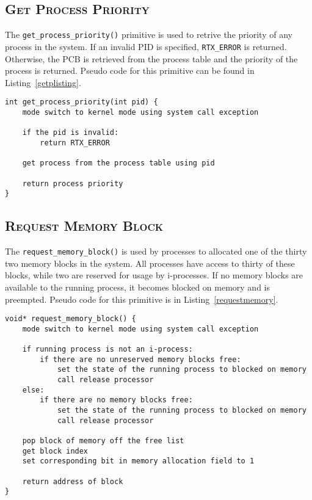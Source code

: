 \documentclass[oneside]{report}
\begin{document}
\subsection{\textsc{Get Process Priority}}
The \texttt{get\_process\_priority()} primitive is used to retrive the
priority of any process in the system. If an invalid PID is specified,
\texttt{RTX\_ERROR} is returned. Otherwise, the PCB is retrieved from
the process table and the priority of the process is returned. Pseudo
code for this primitive can be found in Listing~\ref{getplisting}.

\begin{lstlisting}
int get_process_priority(int pid) {
    mode switch to kernel mode using system call exception
    
    if the pid is invalid:
        return RTX_ERROR

    get process from the process table using pid
    
    return process priority
}
\end{lstlisting}

\subsection{\textsc{Request Memory Block}}

The \texttt{request\_memory\_block()} is used by processes to
allocated one of the thirty two memory blocks in the system. All
processes have access to thirty of these blocks, while two are
reserved for usage by i-processes. If no memory blocks are available
to the running process, it becomes blocked on memory and is
preempted. Pseudo code for this primitive is in
Listing~\ref{requestmemory}.

\begin{lstlisting}
void* request_memory_block() {
    mode switch to kernel mode using system call exception

    if running process is not an i-process:
        if there are no unreserved memory blocks free:
            set the state of the running process to blocked on memory
            call release processor
    else:
        if there are no memory blocks free:
            set the state of the running process to blocked on memory
            call release processor

    pop block of memory off the free list        
    get block index
    set corresponding bit in memory allocation field to 1

    return address of block
}
\end{lstlisting}
\end{document}
